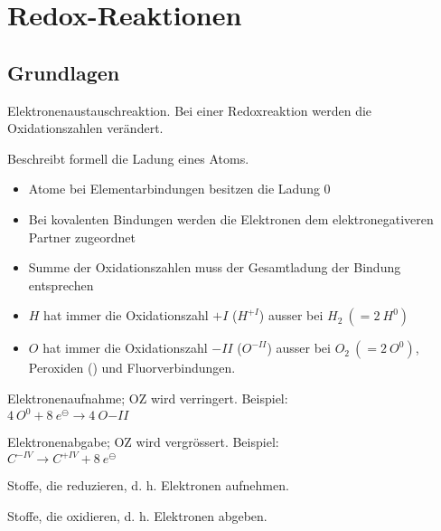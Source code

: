 \section{Redox-Reaktionen}

\subsection{Grundlagen}

\begin{definition}[Redoxreaktion]
	Elektronenaustauschreaktion. Bei einer Redoxreaktion werden die Oxidationszahlen verändert.
\end{definition}

\begin{definition}[Oxidationszahl]
	Beschreibt formell die Ladung eines Atoms.
	
	\begin{itemize}
		\item Atome bei Elementarbindungen besitzen die Ladung 0
		\item Bei kovalenten Bindungen werden die Elektronen dem elektronegativeren Partner zugeordnet
		\item Summe der Oxidationszahlen muss der Gesamtladung der Bindung entsprechen
		\item $H$ hat immer die Oxidationszahl $+I$ ($H^{+I}$) ausser bei $H_2\ (=2\ H^0)$
		\item $O$ hat immer die Oxidationszahl $-II$ ($O^{-II}$) ausser bei $O_2\ (=2\ O^0)$, Peroxiden () und Fluorverbindungen.
	\end{itemize}
\end{definition}

\begin{definition}[Reduktion]
	Elektronenaufnahme; OZ wird verringert. Beispiel:\\
	$4\ O^0 + 8\ e^\ominus\rightarrow 4\ O{-II}$
\end{definition}

\begin{definition}[Oxidation]
	Elektronenabgabe; OZ wird vergrössert. Beispiel:\\
	$C^{-IV} \rightarrow C^{+IV} + 8\ e^\ominus$
\end{definition}

\begin{definition}[Oxidationsmittel]
	Stoffe, die reduzieren, d. h. Elektronen aufnehmen.
\end{definition}

\begin{definition}[Reduktionsmittel]
	Stoffe, die oxidieren, d. h. Elektronen abgeben.
\end{definition}

